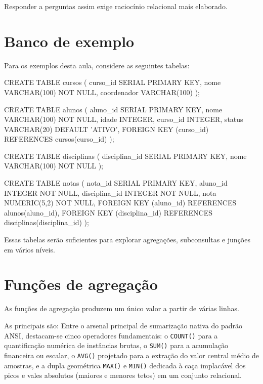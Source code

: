 Responder a perguntas assim exige raciocínio relacional mais elaborado.

\section{Banco de exemplo}

Para os exemplos desta aula, considere as seguintes tabelas:

\begin{sqlcode}
CREATE TABLE cursos (
    curso_id SERIAL PRIMARY KEY,
    nome VARCHAR(100) NOT NULL,
    coordenador VARCHAR(100)
);
\end{sqlcode}

\begin{sqlcode}
CREATE TABLE alunos (
    aluno_id SERIAL PRIMARY KEY,
    nome VARCHAR(100) NOT NULL,
    idade INTEGER,
    curso_id INTEGER,
    status VARCHAR(20) DEFAULT 'ATIVO',
    FOREIGN KEY (curso_id) REFERENCES cursos(curso_id)
);
\end{sqlcode}

\begin{sqlcode}
CREATE TABLE disciplinas (
    disciplina_id SERIAL PRIMARY KEY,
    nome VARCHAR(100) NOT NULL
);
\end{sqlcode}

\begin{sqlcode}
CREATE TABLE notas (
    nota_id SERIAL PRIMARY KEY,
    aluno_id INTEGER NOT NULL,
    disciplina_id INTEGER NOT NULL,
    nota NUMERIC(5,2) NOT NULL,
    FOREIGN KEY (aluno_id) REFERENCES alunos(aluno_id),
    FOREIGN KEY (disciplina_id) REFERENCES disciplinas(disciplina_id)
);
\end{sqlcode}

Essas tabelas serão suficientes para explorar agregações, subconsultas e junções em vários níveis.

\section{Funções de agregação}

As funções de agregação produzem um único valor a partir de várias linhas.

As principais são:
Entre o arsenal principal de sumarização nativa do padrão ANSI, destacam-se cinco operadores fundamentais: o \texttt{COUNT()} para a quantificação numérica de instâncias brutas, o \texttt{SUM()} para a acumulação financeira ou escalar, o \texttt{AVG()} projetado para a extração do valor central médio de amostras, e a dupla geométrica \texttt{MAX()} e \texttt{MIN()} dedicada à caça implacável dos picos e vales absolutos (maiores e menores tetos) em um conjunto relacional.

